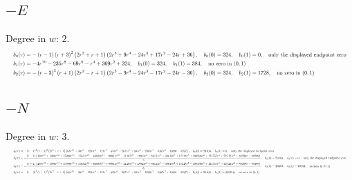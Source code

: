 \documentclass[11pt]{article}
\numberwithin{equation}{section}
\begin{document}
\subsection*{$-E$}
Degree in $w$: $2$.
\[
\resizebox{\textwidth}{!}{$\begin{aligned}
b_{0}(r)&=- \left(r - 1\right) \left(r + 3\right)^{2} \left(2 r^{2} + r + 1\right) \left(2 r^{5} + 9 r^{4} - 24 r^{3} + 17 r^{2} - 24 r + 36\right),\quad b_{0}(0)=324,\quad b_{0}(1)=0,\quad \text{only the displayed endpoint zero}\\
b_{1}(r)&=- 4 r^{10} - 235 r^{8} - 69 r^{6} - r^{4} + 369 r^{2} + 324,\quad b_{1}(0)=324,\quad b_{1}(1)=384,\quad \text{no zero in }(0,1)\\
b_{2}(r)&=- \left(r - 3\right)^{2} \left(r + 1\right) \left(2 r^{2} - r + 1\right) \left(2 r^{5} - 9 r^{4} - 24 r^{3} - 17 r^{2} - 24 r - 36\right),\quad b_{2}(0)=324,\quad b_{2}(1)=1728,\quad \text{no zero in }(0,1)\\
\end{aligned}$}
\]
\subsection*{$-N$}
Degree in $w$: $3$.
\[
\resizebox{\textwidth}{!}{$\begin{aligned}
b_{0}(r)&=- \left(r - 1\right)^{2} \left(r + 3\right)^{2} \left(2 r^{2} + r + 1\right) \left(68 r^{10} + 30 r^{9} - 1204 r^{8} - 421 r^{7} - 653 r^{6} + 2671 r^{5} + 931 r^{4} + 2905 r^{3} - 4067 r^{2} - 1089 r - 3267\right),\quad b_{0}(0)=29403,\quad b_{0}(1)=0,\quad \text{only the displayed endpoint zero}\\
b_{1}(r)&=- \frac{\left(r - 1\right) \left(408 r^{15} + 1080 r^{14} + 15990 r^{13} - 17634 r^{12} - 63039 r^{11} - 99031 r^{10} - 41407 r^{9} - 48943 r^{8} + 86114 r^{7} + 38610 r^{6} + 17448 r^{5} + 109296 r^{4} + 121557 r^{3} + 227421 r^{2} + 88209 r + 88209\right)}{3},\quad b_{1}(0)=29403,\quad b_{1}(1)=0,\quad \text{only the displayed endpoint zero}\\
b_{2}(r)&=- \frac{\left(r + 1\right) \left(408 r^{15} - 1080 r^{14} + 15990 r^{13} + 17634 r^{12} - 63039 r^{11} + 99031 r^{10} - 41407 r^{9} + 48943 r^{8} + 86114 r^{7} - 38610 r^{6} + 17448 r^{5} - 109296 r^{4} + 121557 r^{3} - 227421 r^{2} + 88209 r - 88209\right)}{3},\quad b_{2}(0)=29403,\quad b_{2}(1)=49152,\quad \text{no zero in }(0,1)\\
b_{3}(r)&=- \left(r - 3\right)^{2} \left(r + 1\right)^{2} \left(2 r^{2} - r + 1\right) \left(68 r^{10} - 30 r^{9} - 1204 r^{8} + 421 r^{7} - 653 r^{6} - 2671 r^{5} + 931 r^{4} - 2905 r^{3} - 4067 r^{2} + 1089 r - 3267\right),\quad b_{3}(0)=29403,\quad b_{3}(1)=393216,\quad \text{no zero in }(0,1)\\
\end{aligned}$}
\]
\endgroup
\end{document}
